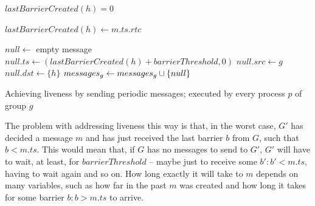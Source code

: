 \documentclass[times, 10pt]{article}
\begin{document}
\begin{algorithm}
\begin{distribalgo}[1]
\blankline
{}
    \STATE $lastBarrierCreated(h) = 0$
  \ENDINDENT
\ENDINDENT

\blankline
{}
  \STATE $lastBarrierCreated(h) \leftarrow m.ts.rtc$
\ENDINDENT

\blankline
{}
  \STATE $null \leftarrow$ empty message
  \STATE $null.ts \leftarrow (lastBarrierCreated(h) + barrierThreshold, 0)$ \label{algline:samenullid}
  \STATE $null.src \leftarrow g$
  \STATE $null.dst \leftarrow \{h\}$ 
  \STATE $messages\text{$_g$} \leftarrow messages\text{$_g$} \cup \{null\}$ \label{algline:enqnull}
\ENDINDENT 

\blankline
\caption{Achieving liveness by sending periodic messages; executed by every process $p$ of group $g$}
\label{algorithm:nullperiodic}
\end{distribalgo} 
\end{algorithm}

The problem with addressing liveness this way is that, in the worst case, $G'$ has decided a message $m$ and has just received the last barrier $b$ from $G$, such that $b < m.ts$. This would mean that, if $G$ has no messages to send to $G'$, $G'$ will have to wait, at least, for $barrierThreshold$ -- maybe just to receive some $b' : b' < m.ts$, having to wait again and so on. How long exactly it will take to \cons{} $m$ depends on many variables, such as how far in the past $m$ was created and how long it takes for some barrier $b: b > m.ts$ to arrive.%
\end{document}
